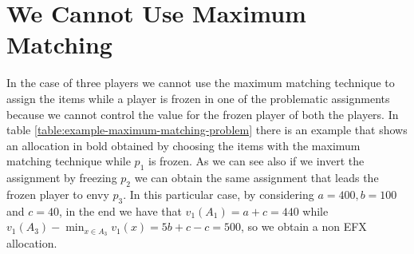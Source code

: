 \section{We Cannot Use Maximum Matching}
In the case of three players we cannot use the maximum matching technique to assign the items while a player is frozen in one of the problematic assignments because we cannot control the value for the frozen player of both the players. In table \ref{table:example-maximum-matching-problem} there is an example that shows an allocation in bold obtained by choosing the items with the maximum matching technique while $p_1$ is frozen. As we can see also if we invert the assignment by freezing $p_2$ we can obtain the same assignment that leads the frozen player to envy $p_3$. In this particular case, by considering $a=400, b=100$ and $c=40$, in the end we have that $v_1(A_1) = a + c = 440$ while $v_1(A_3) - \min_{x \in A_3} v_1(x) = 5b + c -c = 500$, so we obtain a non EFX allocation. 
